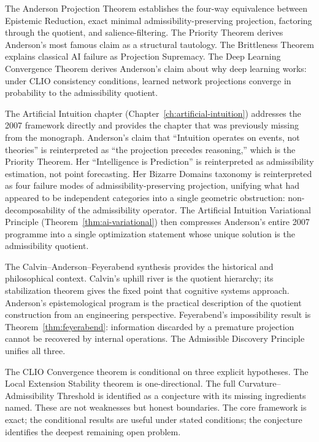 \documentclass[12pt, a4paper, oneside]{book}
\begin{document}
The Anderson Projection Theorem establishes the four-way equivalence
between Epistemic Reduction, exact minimal admissibility-preserving
projection, factoring through the quotient, and salience-filtering.
The Priority Theorem derives Anderson's most famous claim as a structural
tautology. The Brittleness Theorem explains classical AI failure as
Projection Supremacy. The Deep Learning Convergence Theorem derives
Anderson's claim about why deep learning works: under CLIO consistency
conditions, learned network projections converge in probability to the
admissibility quotient.

The Artificial Intuition chapter (Chapter~\ref{ch:artificial-intuition})
addresses the 2007 framework directly and provides the chapter that was
previously missing from the monograph. Anderson's claim that
``Intuition operates on events, not theories'' is reinterpreted as
``the projection precedes reasoning,'' which is the Priority Theorem.
Her ``Intelligence is Prediction'' is reinterpreted as admissibility
estimation, not point forecasting. Her Bizarre Domains taxonomy is
reinterpreted as four failure modes of admissibility-preserving
projection, unifying what had appeared to be independent categories into
a single geometric obstruction: non-decomposability of the admissibility
operator. The Artificial Intuition Variational Principle
(Theorem~\ref{thm:ai-variational}) then compresses Anderson's entire
2007 programme into a single optimization statement whose unique solution
is the admissibility quotient.

The Calvin--Anderson--Feyerabend synthesis provides the historical and
philosophical context. Calvin's uphill river is the quotient hierarchy;
its stabilization theorem gives the fixed point that cognitive systems
approach. Anderson's epistemological program is the practical description
of the quotient construction from an engineering perspective. Feyerabend's
impossibility result is Theorem~\ref{thm:feyerabend}: information
discarded by a premature projection cannot be recovered by internal
operations. The Admissible Discovery Principle unifies all three.

The CLIO Convergence theorem is conditional on three explicit hypotheses.
The Local Extension Stability theorem is one-directional. The full
Curvature--Admissibility Threshold is identified as a conjecture with its
missing ingredients named. These are not weaknesses but honest boundaries.
The core framework is exact; the conditional results are useful under
stated conditions; the conjecture identifies the deepest remaining open
problem.
\end{document}
